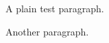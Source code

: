 \documentclass[]{minimal}
\begin{document}
A plain test paragraph.

Another paragraph.
\end{document}
